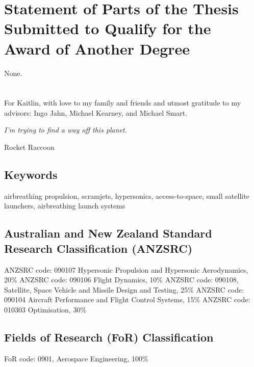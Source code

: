 \section*{Statement of Parts of the Thesis Submitted to Qualify for the Award of Another Degree}

None.

\clearpage

\section*{} 
  For Kaitlin, with love to my family and friends and utmost gratitude to my advisors: Ingo Jahn, Michael Kearney, and Michael Smart. 

      \vspace*{\fill}
\begin{flushright}
	\textit{I'm trying to find a way off this planet.}
	
Rocket Raccoon
\end{flushright}
\clearpage
\subsection*{Keywords}
  airbreathing propulsion, scramjets, hypersonics, access-to-space, small satellite launchers, airbreathing launch systems

\subsection*{Australian and New Zealand Standard Research Classification (ANZSRC)}

  ANZSRC code: 090107 Hypersonic Propulsion and Hypersonic Aerodynamics, 20\% \newline
 ANZSRC code: 090106 Flight Dynamics, 10\% \newline
 ANZSRC code: 090108, Satellite, Space Vehicle and Missile Design and Testing, 25\% \newline
ANZSRC code: 090104 Aircraft Performance and Flight Control Systems, 15\% \newline
ANZSRC code: 010303 Optimisation, 30\% \newline

\subsection*{Fields of Research (FoR) Classification}

  FoR code: 0901, Aerospace Engineering, 100\%

\tableofcontents

\listoffigures
{}
\listoftables
{}
\printnomenclature